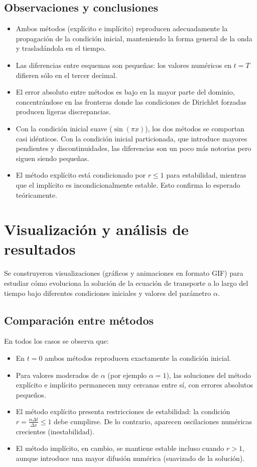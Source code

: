 \documentclass[12pt,a4paper]{article}
\begin{document}
\subsection{Observaciones y conclusiones}

\begin{itemize}
    \item Ambos métodos (explícito e implícito) reproducen adecuadamente la propagación de la condición inicial, manteniendo la forma general de la onda y trasladándola en el tiempo.
    \item Las diferencias entre esquemas son pequeñas: los valores numéricos en $t=T$ difieren sólo en el tercer decimal.
    \item El error absoluto entre métodos es bajo en la mayor parte del dominio, concentrándose en las fronteras donde las condiciones de Dirichlet forzadas producen ligeras discrepancias.
    \item Con la condición inicial suave ($\sin(\pi x)$), los dos métodos se comportan casi idénticos. Con la condición inicial particionada, que introduce mayores pendientes y discontinuidades, las diferencias son un poco más notorias pero siguen siendo pequeñas.
    \item El método explícito está condicionado por $r \leq 1$ para estabilidad, mientras que el implícito es incondicionalmente estable. Esto confirma lo esperado teóricamente.
\end{itemize}

\section{Visualización y análisis de resultados}

Se construyeron visualizaciones (gráficos y animaciones en formato GIF) para estudiar cómo evoluciona la solución de la ecuación de transporte a lo largo del tiempo bajo diferentes condiciones iniciales y valores del parámetro $\alpha$.

\subsection*{Comparación entre métodos}
En todos los casos se observa que:
\begin{itemize}
    \item En $t=0$ ambos métodos reproducen exactamente la condición inicial.
    \item Para valores moderados de $\alpha$ (por ejemplo $\alpha=1$), las soluciones del método explícito e implícito permanecen muy cercanas entre sí, con errores absolutos pequeños.
    \item El método explícito presenta restricciones de estabilidad: la condición $r = \frac{\alpha \Delta t}{\Delta x} \leq 1$ debe cumplirse. De lo contrario, aparecen oscilaciones numéricas crecientes (inestabilidad).
    \item El método implícito, en cambio, se mantiene estable incluso cuando $r>1$, aunque introduce una mayor difusión numérica (suavizado de la solución).
\end{itemize}
\end{document}

